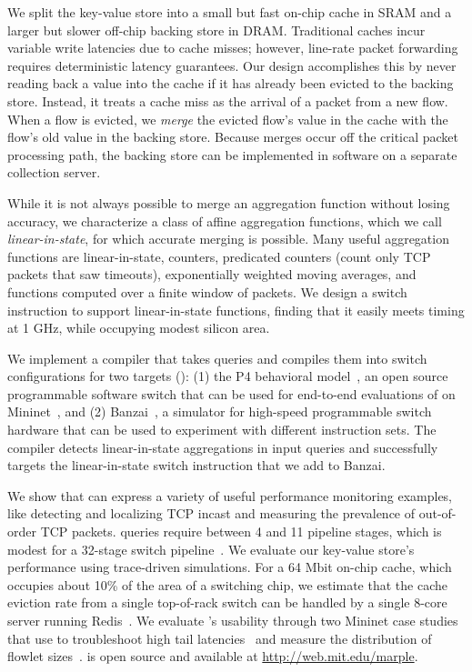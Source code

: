 We split the key-value store into a small but fast on-chip cache in SRAM and a
larger but slower off-chip backing store in DRAM. Traditional caches incur
variable write latencies due to cache misses; however, line-rate packet
forwarding requires deterministic latency guarantees. Our design accomplishes
this by never reading back a value into the cache if it has already been
evicted to the backing store. Instead, it treats a cache miss as the arrival of
a packet from a new flow. When a flow is evicted, we {\em merge} the evicted flow's value in the cache with the flow's
old value in the backing store. Because merges occur off the
critical packet processing path, the backing store can be implemented in
software on a separate collection server.%

While it is not always possible to merge an aggregation function without losing
accuracy, we characterize a class of affine aggregation functions, which we
call {\em linear-in-state}, for which accurate merging is possible.  Many
useful aggregation functions are linear-in-state, \eg counters, predicated
counters (\eg count only TCP packets that saw timeouts), exponentially weighted
moving averages, and functions computed over a finite window of packets.  We
design a switch instruction to support linear-in-state functions, finding that
it easily meets timing at 1 GHz, while occupying modest silicon area.

 We implement a compiler that takes \TheSystem queries
and compiles them into switch configurations for two targets ():
(1) the P4 behavioral model~\cite{p4-bmv2}, an open source programmable
software switch that can be used for end-to-end evaluations of \TheSystem on
Mininet~\cite{mininet}, and (2) Banzai~\cite{domino_sigcomm}, a simulator for high-speed
programmable switch hardware that can be used to experiment with different instruction sets.
The \TheSystem compiler detects linear-in-state aggregations in input queries
and successfully targets the linear-in-state switch instruction that we add to
Banzai.

 We show that \TheSystem can express a variety of useful
performance monitoring examples, like detecting and localizing TCP incast and
measuring the prevalence of out-of-order TCP packets. \TheSystem queries
require between 4 and 11 pipeline stages, which is modest for a 32-stage switch
pipeline~\cite{rmt}. We evaluate our key-value store's performance using
trace-driven simulations. For a 64 Mbit on-chip cache, which occupies about
10\% of the area of a \tengswitch switching chip, we estimate that the cache eviction rate
from a single top-of-rack switch can be handled by a single 8-core server running
Redis~\cite{redis}.
We evaluate \TheSystem's usability through two Mininet case studies
that use \TheSystem to troubleshoot high tail latencies~\cite{barefoot-demo} and
measure the distribution of flowlet sizes~\cite{conga}. \TheSystem is open
source and available at \url{http://web.mit.edu/marple}.

